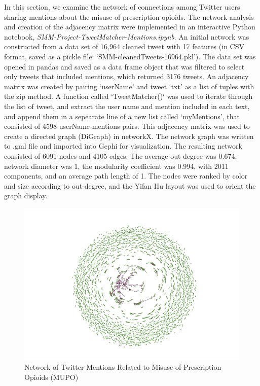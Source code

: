 \documentclass[sigconf]{acmart}
\begin{document}
In this section, we examine the network of connections among Twitter users 
sharing mentions about the misuse of prescription opioids. The network analysis 
and creation of the adjacency matrix were implemented in an interactive Python 
notebook, \emph{SMM-Project-TweetMatcher-Mentions.ipynb}. An initial network 
was constructed from a data set of 16,964 cleaned tweet with 17 features
(in CSV format, saved as a pickle file: `SMM-cleanedTweets-16964.pkl'). The 
data set was opened in pandas and saved as a data frame object that was 
filtered to select only tweets that included mentions, which returned 3176 
tweets. An adjacency matrix was created by pairing `userName' and tweet `txt' 
as a list of tuples with the zip method. A function called `TweetMatcher()` 
was used to iterate through the list of tweet, and extract the user name and 
mention included in each text, and append them in a sepearate line of a new 
list called ‘myMentions’, that consisted of 4598 userName-mentions pairs. 
This adjacency matrix was used to create a directed graph (DiGraph) in 
networkX. The network graph was written to .gml file and imported into 
Gephi for visualization. The resulting network consisted of 6091 nodes and 
4105 edges. The average out degree was 0.674, network diameter was 1, the 
modularity coefficient was 0.994, with 2011 components, and an average path 
length of 1. The nodes were ranked by color and size according to out-degree,
and the Yifan Hu layout was used to orient the graph display.

\begin{figure}[!ht]
  \centering\includegraphics[width=\columnwidth]{images/Figure7.pdf}
  \caption{Network of Twitter Mentions Related to Misuse of Prescription 
  Opioids (MUPO)}
  \label{f:Figure7}
\end{figure}
\end{document}
